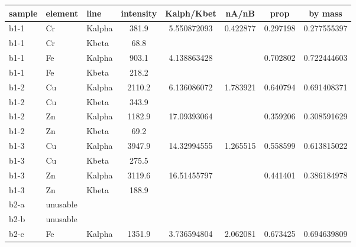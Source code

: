 \documentclass[11pt,a4paper,twoside,onecolumn]{article}
\begin{document}
\begin{table}[htbp]
\centering
{}
\begin{tabular}{@{}
    lll
    S[table-figures-decimal = 2, round-precision=1]
    S[table-figures-decimal = 2, round-precision=2]
    S[table-figures-decimal = 2, round-precision=2]
    S[table-figures-decimal = 2, round-precision=2]
    S[table-figures-decimal = 2, round-precision=2]
    @{}
    }
\toprule
sample & element  & line   &{intensity}& {Kalph/Kbet}& {nA/nB}  & {prop}   & {by mass}   \\ \midrule
b1-1   & Cr       & Kalpha & 381.9     & 5.550872093 & 0.422877 & 0.297198 & 0.277555397 \\
b1-1   & Cr       & Kbeta  & 68.8      &             &          &          &             \\
b1-1   & Fe       & Kalpha & 903.1     & 4.138863428 &          & 0.702802 & 0.722444603 \\
b1-1   & Fe       & Kbeta  & 218.2     &             &          &          &             \\ \midrule
b1-2   & Cu       & Kalpha & 2110.2    & 6.136086072 & 1.783921 & 0.640794 & 0.691408371 \\
b1-2   & Cu       & Kbeta  & 343.9     &             &          &          &             \\
b1-2   & Zn       & Kalpha & 1182.9    & 17.09393064 &          & 0.359206 & 0.308591629 \\
b1-2   & Zn       & Kbeta  & 69.2      &             &          &          &             \\ \midrule
b1-3   & Cu       & Kalpha & 3947.9    & 14.32994555 & 1.265515 & 0.558599 & 0.613815022 \\
b1-3   & Cu       & Kbeta  & 275.5     &             &          &          &             \\
b1-3   & Zn       & Kalpha & 3119.6    & 16.51455797 &          & 0.441401 & 0.386184978 \\
b1-3   & Zn       & Kbeta  & 188.9     &             &          &          &             \\ \midrule
b2-a   & unusable &        &           &             &          &          &             \\ \midrule
b2-b   & unusable &        &           &             &          &          &             \\ \midrule
b2-c   & Fe       & Kalpha & 1351.9    & 3.736594804 & 2.062081 & 0.673425 & 0.694639809 \\

\end{tabular}
\end{table}
\end{document}
